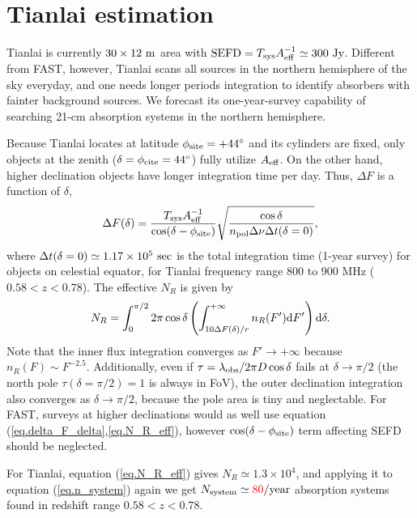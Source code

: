 \documentclass[]{raa}
\newcommand{\diff}{{\rm d}}
\newcommand{\tcr}{\textcolor{red}}
\begin{document}
\section{Tianlai estimation}\label{sec.Tianlai}

Tianlai is currently $30\times 12\ {\rm m}$ area with
\tcr{${\rm SEFD}=T_{\rm sys}A_{\rm eff}^{-1}\simeq 300\ {\rm Jy}$}. Different from FAST, however,
Tianlai scans all sources in the northern hemisphere of the sky
everyday, and one needs longer periods integration to
identify absorbers with fainter background sources.
We forecast its one-year-survey capability of searching 21-cm
absorption systems in the northern hemisphere.

Because Tianlai locates at latitude
$\phi_{\rm site}=+44^\circ$ and its cylinders are fixed, only
objects at the zenith ($\delta=\phi_{\rm cite}=44^\circ$) fully utilize
$A_{\rm eff}$. On the other hand, higher declination objects
have longer integration time per day. Thus, $\Delta F$ is
a function of $\delta$, 
\begin{equation}\label{eq.delta_F_delta}
    \Delta F(\delta) = \frac{T_{\rm sys}A_{\rm eff}^{-1}}{\cos(\delta-\phi_{\rm site})}
    {\sqrt{\frac{\cos\delta}{n_{\rm pol}\Delta\nu\Delta t(\delta=0)}}},
\end{equation}
where $\Delta t(\delta=0)\simeq 1.17\times 10^5\ {\rm sec}$ is the
total integration time (1-year survey) for objects on celestial equator,
for Tianlai frequency range 800 to 900 MHz ($0.58<z<0.78$).
The effective $N_R$ is given by
\begin{equation}\label{eq.N_R_eff}
    N_R=\int_0^{\pi/2}2\pi\cos\delta
    \left(\int_{10\Delta F(\delta)/r}^{+\infty}
    n_R(F')\diff F'\right)
    \diff\delta.
\end{equation}
Note that the inner flux integration converges as
$F'\rightarrow+\infty$ because $n_R(F)\sim F^{-2.5}$.
Additionally, even if $\tau=\lambda_{\rm obs}/2\pi D\cos\delta$
fails at $\delta\rightarrow\pi/2$ (the north pole
$\tau(\delta=\pi/2)=1$ is always in FoV),
the outer declination integration also converges
as $\delta\rightarrow\pi/2$, because the pole area is
tiny and neglectable.
For FAST, surveys at higher declinations would as well
use equation (\ref{eq.delta_F_delta},\ref{eq.N_R_eff}),
however $\cos(\delta-\phi_{\rm site})$ term affecting
SEFD should be neglected.

For Tianlai, equation (\ref{eq.N_R_eff}) gives $N_R\simeq 1.3\times 10^4$,
and applying it to equation (\ref{eq.n_system}) again
we get $N_{\rm system}\simeq \tcr{80} {\rm /year}$ absorption
systems found in redshift range $0.58<z<0.78$.
\end{document}
